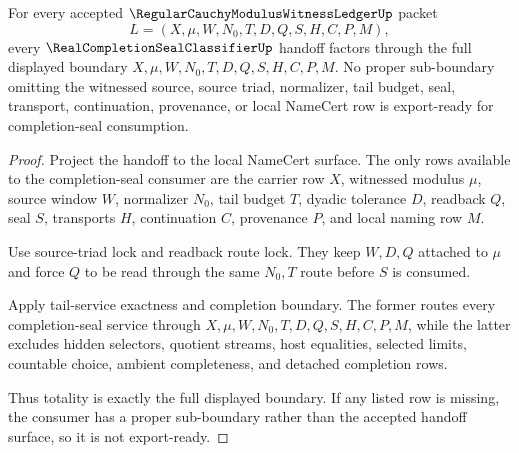 \begin{theorem}
\label{thm:regular-cauchy-modulus-witness-ledger-completion-seal-handoff-totality}
For every accepted $\RegularCauchyModulusWitnessLedgerUp$ packet
$$
L=(X,\mu,W,N_0,T,D,Q,S,H,C,P,M),
$$
every $\RealCompletionSealClassifierUp$ handoff factors through the full displayed boundary $X,\mu,W,N_0,T,D,Q,S,H,C,P,M$. No proper sub-boundary omitting the witnessed source, source triad, normalizer, tail budget, seal, transport, continuation, provenance, or local NameCert row is export-ready for completion-seal consumption.
\end{theorem}
\begin{proof}
Project the handoff to the local NameCert surface. The only rows available to the completion-seal consumer are the carrier row $X$, witnessed modulus $\mu$, source window $W$, normalizer $N_0$, tail budget $T$, dyadic tolerance $D$, readback $Q$, seal $S$, transports $H$, continuation $C$, provenance $P$, and local naming row $M$.

Use source-triad lock and readback route lock. They keep $W,D,Q$ attached to $\mu$ and force $Q$ to be read through the same $N_0,T$ route before $S$ is consumed.

Apply tail-service exactness and completion boundary. The former routes every completion-seal service through $X,\mu,W,N_0,T,D,Q,S,H,C,P,M$, while the latter excludes hidden selectors, quotient streams, host equalities, selected limits, countable choice, ambient completeness, and detached completion rows.

Thus totality is exactly the full displayed boundary. If any listed row is missing, the consumer has a proper sub-boundary rather than the accepted handoff surface, so it is not export-ready.
\end{proof}

